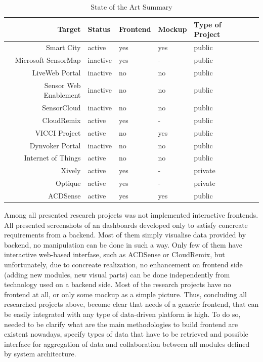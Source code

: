     \begin{table}[H]
	\centering
	\begin{tabular}{|r|l|l|l|l|l|}
	\hline
	Target 			       & Status & Frontend & Mockup & Type of Project \\
	\hline 
	Smart City		       & active & yes & yes & public \\
	\hline
	Microsoft SensorMap   & inactive & yes & - & public \\
	\hline
	LiveWeb Portal	       & inactive & no & no & public \\
	\hline
	Sensor Web Enablement  & inactive & no & no & public \\
	\hline
	SensorCloud		       & inactive & no & no & public \\
	\hline
	CloudRemix		       & active & yes & - & public \\
	\hline
	VICCI Project		   & active & no & yes & public \\
	\hline
	Dynvoker Portal		   & inactive & no & no & public \\
	\hline
	Internet of Things	   & active & no & no & public \\
	\hline
	Xively                 & active & yes & - & private \\
	\hline
	Optique                & active & yes & - & private \\
	\hline
	ACDSense               & active & yes & yes & public \\
	\hline
	\end{tabular}
	\caption[State of the Art]{State of the Art Summary}
	\label{tab:state_of_the_art}
	\end{table}

Among all presented research projects was not implemented interactive frontends. All presented screenshots of an dashboards developed only to satisfy concreate requirements from a backend. Most of them simply visualise data provided by backend, no manipulation can be done in such a way. Only few of them have interactive web-based interfase, such as ACDSense or CloudRemix, but unfortunately, due to concreate realization, no enhancement on frontend side (adding new modules, new visual parts) can be done independently from technology used on a backend side. Most of the research projects have no frontend at all, or only some mockup as a simple picture. Thus, concluding all researched projects above, become clear that needs of a generic frontend, that can be easily integrated with any type of data-driven platform is high. To do so, needed to be clarify what are the main methodologies to build frontend are existent nowadays, specify types of data that have to be retrieved and possible interface for aggregation of data and collaboration between all modules defined by system architecture.

